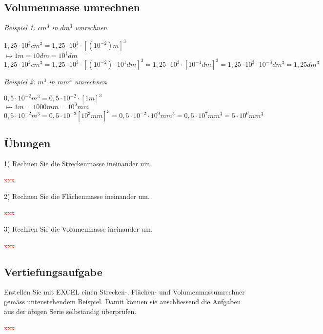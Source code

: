 \documentclass[11pt, a4paper, twoside, fleqn]{article}
\begin{document}
\subsection{Volumenmasse umrechnen}
\begin{flushleft}
\emph{Beispiel 1: \(cm^3\) in \(dm^3\) umrechnen} 
\end{flushleft}
\(1,25 \cdot10^3 cm^3 = 1,25 \cdot10^3 \cdot[(10^{-2})m]^3\) \\
\(\mapsto 1m = 10 dm = 10^1 dm\) \\
\(1,25 \cdot10^3 cm^3 = 1,25 \cdot 10^3 \cdot [(10^{-2}) \cdot 10^1 dm]^3 = 1,25 \cdot10^3 \cdot[10^{-1} dm]^3 = 1,25 \cdot10^3 \cdot10^{-3} dm^3 = 1,25 dm^3\)
\newpage
\begin{flushleft}
\emph{Beispiel 2: \(m^3\) in \(mm^3\) umrechnen} 
\end{flushleft}
\(0,5 \cdot10^{-2} m^3 = 0,5 \cdot10^{-2} \cdot[1m]^3\) \\
\(\mapsto 1m = 1000 mm = 10^3 mm\) \\
\(0,5 \cdot10^{-2} m^3 = 0,5 \cdot10^{-2} [10^3 mm]^3 = 0,5 \cdot10^{-2} \cdot10^9 mm^3 = 0,5 \cdot10^7 mm^3 = 5 \cdot10^6 mm^3\)
\subsection{Übungen}
\begin{flushleft}
1) Rechnen Sie die Streckenmasse ineinander um.
\end{flushleft}
\noindent \textcolor{red}{xxx}
\begin{flushleft}
2) Rechnen Sie die Flächenmasse ineinander um.
\end{flushleft}
\noindent \textcolor{red}{xxx}
\begin{flushleft}
3) Rechnen Sie die Volumenmasse ineinander um.
\end{flushleft}
\noindent \textcolor{red}{xxx} 
\subsection{Vertiefungsaufgabe}
\begin{flushleft}
Erstellen Sie mit EXCEL einen Strecken-, Flächen- und Volumenmassumrechner gemäss untenstehendem Beispiel. Damit können sie anschliessend die Aufgaben aus der obigen Serie selbständig überprüfen.
\end{flushleft}
\noindent \textcolor{red}{xxx}
\newpage\
\end{document}
